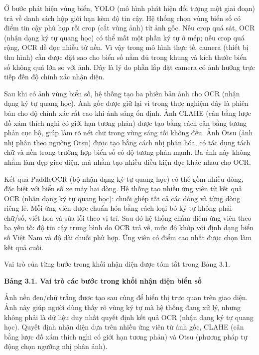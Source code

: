 \documentclass[a4paper,14pt]{extreport}
\begin{document}
Ở bước phát hiện vùng biển, YOLO (mô hình phát hiện đối tượng một giai đoạn) trả về danh sách hộp giới hạn kèm độ tin cậy. Hệ thống chọn vùng biển số có điểm tin cậy phù hợp rồi crop (cắt vùng ảnh) từ ảnh gốc. Nếu crop quá sát, OCR (nhận dạng ký tự quang học) có thể mất một phần ký tự ở mép; nếu crop quá rộng, OCR dễ đọc nhiễu từ nền. Vì vậy trong mô hình thực tế, camera (thiết bị thu hình) cần được đặt sao cho biển số nằm đủ trong khung và kích thước biển số không quá lớn so với ảnh. Đây là lý do phần lắp đặt camera có ảnh hưởng trực tiếp đến độ chính xác nhận diện.

Sau khi có ảnh vùng biển số, hệ thống tạo ba phiên bản ảnh cho OCR (nhận dạng ký tự quang học). Ảnh gốc được giữ lại vì trong thực nghiệm đây là phiên bản cho độ chính xác rất cao khi ánh sáng ổn định. Ảnh CLAHE (cân bằng lược đồ xám thích nghi có giới hạn tương phản) được tạo bằng cách cân bằng tương phản cục bộ, giúp làm rõ nét chữ trong vùng sáng tối không đều. Ảnh Otsu (ảnh nhị phân theo ngưỡng Otsu) được tạo bằng cách nhị phân hóa, có tác dụng tách chữ và nền trong trường hợp biển số có độ tương phản mạnh. Ba ảnh này không nhằm làm đẹp giao diện, mà nhằm tạo nhiều điều kiện đọc khác nhau cho OCR.

Kết quả PaddleOCR (bộ nhận dạng ký tự quang học) có thể gồm nhiều dòng, đặc biệt với biển số xe máy hai dòng. Hệ thống tạo nhiều ứng viên từ kết quả OCR (nhận dạng ký tự quang học): chuỗi ghép tất cả các dòng và từng dòng riêng lẻ. Mỗi ứng viên được chuẩn hóa bằng cách loại bỏ ký tự không phải chữ/số, viết hoa và sửa lỗi theo vị trí. Sau đó hệ thống chấm điểm ứng viên theo ba yếu tố: độ tin cậy trung bình do OCR trả về, mức độ khớp với định dạng biển số Việt Nam và độ dài chuỗi phù hợp. Ứng viên có điểm cao nhất được chọn làm kết quả cuối.

Vai trò của từng bước trong khối nhận diện được tóm tắt trong Bảng 3.1.

\textbf{Bảng 3.1. Vai trò các bước trong khối nhận diện biển số}

Ảnh nền đen/chữ trắng được tạo sau cùng để hiển thị trực quan trên giao diện. Ảnh này giúp người dùng thấy rõ vùng ký tự mà hệ thống đang xử lý, nhưng không phải là dữ liệu duy nhất quyết định kết quả OCR (nhận dạng ký tự quang học). Quyết định nhận diện dựa trên nhiều ứng viên từ ảnh gốc, CLAHE (cân bằng lược đồ xám thích nghi có giới hạn tương phản) và Otsu (phương pháp tự động chọn ngưỡng nhị phân ảnh).
\end{document}
